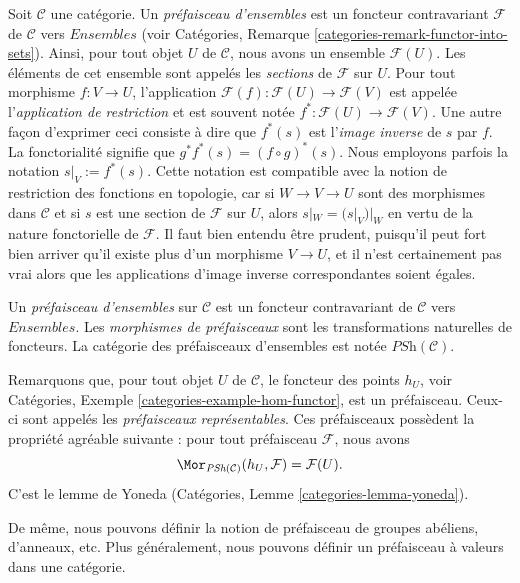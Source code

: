 \noindent
Soit $\mathcal{C}$ une catégorie.
Un {\it préfaisceau d’ensembles} est un foncteur contravariant $\mathcal{F}$
de $\mathcal{C}$ vers $\textit{Ensembles}$ (voir Catégories, Remarque
\ref{categories-remark-functor-into-sets}).
Ainsi, pour tout objet $U$ de $\mathcal{C}$, nous avons un ensemble
$\mathcal{F}(U)$. Les éléments de cet ensemble sont appelés
les {\it sections} de $\mathcal{F}$ sur $U$. Pour tout morphisme
$f : V \to U$, l’application $\mathcal{F}(f) : \mathcal{F}(U) \to \mathcal{F}(V)$
est appelée l’{\it application de restriction} et est souvent notée
$f^\ast : \mathcal{F}(U) \to \mathcal{F}(V)$. Une autre façon
d’exprimer ceci consiste à dire que $f^*(s)$ est l’{\it image inverse}
de $s$ par $f$. La fonctorialité signifie que $g^* f^* (s) = (f \circ g)^*(s)$.
Nous employons parfois la notation $s|_V := f^\ast(s)$.
Cette notation est compatible avec la notion de restriction
des fonctions en topologie, car si $W \to V \to U$
sont des morphismes dans $\mathcal{C}$ et si $s$ est une section de
$\mathcal{F}$ sur $U$, alors $s|_W = (s|_V)|_W$ en vertu de la
nature fonctorielle de $\mathcal{F}$. Il faut bien entendu être
prudent, puisqu’il peut fort bien arriver
qu’il existe plus d’un morphisme $V \to U$, et il n’est
certainement pas vrai alors que les applications d’image inverse
correspondantes soient égales.

\begin{definition}
\label{definition-presheaves-sets}
Un {\it préfaisceau d’ensembles} sur $\mathcal{C}$ est un foncteur
contravariant de $\mathcal{C}$ vers $\textit{Ensembles}$. Les {\it morphismes
de préfaisceaux} sont les transformations naturelles de foncteurs. La catégorie
des préfaisceaux d’ensembles est notée $\textit{PSh}(\mathcal{C})$.
\end{definition}

\noindent
Remarquons que, pour tout objet $U$ de $\mathcal{C}$, le foncteur des
points $h_U$, voir Catégories, Exemple \ref{categories-example-hom-functor},
est un préfaisceau. Ceux-ci sont appelés les {\it préfaisceaux représentables}.
Ces préfaisceaux possèdent la propriété agréable suivante : pour tout
préfaisceau $\mathcal{F}$, nous avons
\begin{equation}
\label{equation-map-representable-into-presheaf}
\Mor_{\textit{PSh}(\mathcal{C})}(h_U, \mathcal{F})
=
\mathcal{F}(U).
\end{equation}
C’est le lemme de Yoneda (Catégories, Lemme \ref{categories-lemma-yoneda}).

\medskip\noindent
De même, nous pouvons définir la notion de préfaisceau de groupes abéliens,
d’anneaux, etc. Plus généralement, nous pouvons définir un préfaisceau à valeurs
dans une catégorie.

